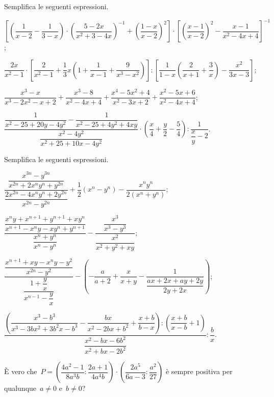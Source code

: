 \begin{esercizio}[\Ast]
\label{ese:14.63}
Semplifica le seguenti espressioni.
\begin{enumeratea}
 \item $\left[\left(\dfrac{1}{x-2}-\dfrac{1}{3-x}\right)\cdot \left(\dfrac{5-2x}{x^{2}+3-4x}\right)^{-1}+\left(\dfrac{1-x}{x-2}\right)^{2}\right]\cdot \left[\left(\dfrac{x-1}{x-2}\right)^{2}-\dfrac{x-1}{x^{2}-4x+4}\right]^{-1}$;
 \item $\dfrac{2x}{x^{2}-1}\cdot \left[\dfrac{2}{x^{2}-1}+\dfrac{1}{3}x\left(1+\dfrac{1}{x-1}+\dfrac{9}{x^{3}-x^{2}}\right)\right]:\left[\dfrac{1}{1-x}\left(\dfrac{2}{x+1}+\dfrac{3}{x}\right)-\dfrac{x^{2}}{3x-3}\right]$;
 \item $\dfrac{x^{3}-x}{x^{3}-2x^{2}-x+2}+\dfrac{x^{3}-8}{x^{2}-4x+4}+\dfrac{x^{4}-5x^{2}+4}{x^{2}-3x+2}+\dfrac{x^{2}-5x+6}{x^{2}-4x+4}$;
 \item $\dfrac{\dfrac{1}{x^{2}-25+20y-4y^{2}}-\dfrac{1}{x^{2}-25+4y^{2}+4xy}}{\dfrac{x^{2}-4y^{2}}{x^{2}+25+10x-4y^{2}}}\cdot \left(\dfrac{x}{4}+\dfrac{y}{2}-\dfrac{5}{4}\right):\dfrac{1}{\dfrac{x}{y}-2}$.
\end{enumeratea}
\end{esercizio}

\begin{esercizio}[\Ast]
\label{ese:14.64}
Semplifica le seguenti espressioni.
\begin{enumeratea}
 \item $\dfrac{\dfrac{x^{3n}-y^{3n}}{x^{2n}+2x^{n}y^{n}+y^{2n}}}{\dfrac{2x^{2n}-4x^{n}y^{n}+2y^{2n}}{x^{2n}-y^{2n}}}+\dfrac{1}{2}\left(x^{n}-y^{n}\right)-\dfrac{x^{n}y^{n}}{2\left(x^{n}+y^{n}\right)}$;
 \item $\dfrac{\dfrac{x^{n}y+x^{n+1}+y^{n+1}+xy^{n}}{x^{n+1}-x^{n}y-xy^{n}+y^{n+1}}}{\dfrac{x^{n}+y^{n}}{x^{n}-y^{n}}}-\dfrac{\dfrac{x^{3}}{x^{3}-y^{3}}}{\dfrac{x^{2}}{x^{2}+y^{2}+xy}}$;
 \item $\dfrac{\dfrac{x^{n+1}+xy-x^{n}y-y^{2}}{x^{2n}-y^{2}}}{\dfrac{1+\dfrac{y}{x}}{x^{n-1}-\dfrac{y}{x}}}-\left(-{\dfrac{a}{a+2}}+\dfrac{x}{x+y}-\dfrac{1}{\dfrac{ax+2x+ay+2y}{2y+2x}}\right)$;
 \item $\dfrac{\left(\dfrac{x^{3}-b^{3}}{x^{3}-3bx^{2}+3b^{2}x-b^{3}}-\dfrac{bx}{x^{2}-2bx+b^{2}}+\dfrac{x+b}{b-x}\right):\left(\dfrac{x+b}{x-b}+1\right)}{\dfrac{x^{2}-bx-6b^{2}}{x^{2}+bx-2b^{2}}}:\dfrac{b}{x}$.
\end{enumeratea}
\end{esercizio}

\begin{esercizio}[\Ast]
\label{ese:14.65}
È vero che~$P=\left(\dfrac{4a^{2}-1}{8a^{3}b}:\dfrac{2a+1}{4a^{4}b}\right)\cdot \left(\dfrac{2a^{5}}{6a-3}:\dfrac{a^{2}}{27}\right)$
è sempre positiva per qualunque~$a{\neq}0$ e~$b{\neq}0$?
\end{esercizio}

